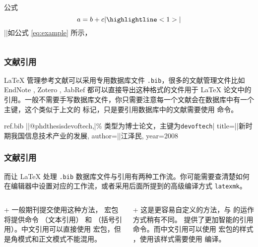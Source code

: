 {\begin{frame}[fragile]
\begin{columns}
\begin{column}{0.5\textwidth}
\begin{codeblock}[]{公式}
\begin{equation}
  a = b + c
|\highlightline<1>|\label{eq:example}
\end{equation}
||如公式 \eqref{eq:example} 所示，
\end{codeblock}
    \end{column}
  \end{columns}
\end{frame}

\begin{frame}[fragile]
  \frametitle{文献引用}
  \LaTeX{} 管理参考文献可以采用专用数据库文件 \texttt{.bib}，很多的文献管理文件比如 EndNote , Zotero , JabRef  都可以直接导出这种格式的文件用于 \LaTeX{} 论文中的引用。一般不需要手写数据库文件，你只需要注意每一个文献会在数据库中有一个主键，这个类似于上文的  标记，只是要引用数据库中的文献需要使用  命令。
  
  \begin{codeblock}[]{ref.bib}
|\highlightline|@phdthesis{devoftech,|\hfill\alert{\% 类型为博士论文，主键为\texttt{devoftech}}|
  title={||新时期我国信息技术产业的发展},
  author={||江泽民},
  year={2008}
}
  \end{codeblock}
\end{frame}

\begin{frame}
  \frametitle{文献引用}
  而让 \LaTeX{} 处理 \texttt{.bib} 数据库文件与引用有两种工作流。你可能需要查清楚如何在编辑器中设置对应的工作流，或者采用后面所提到的高级编译方式 \texttt{latexmk}。
  \begin{columns}
    \begin{column}{0.5\textwidth}
      \begin{block}{ + }
        一般期刊提交使用这种方法， 宏包将提供命令 （文本引用） 和 （括号引用）。中文引用可以直接使用  宏包，但是角模式和正文模式不能混用。
      \end{block}
    \end{column}
    \begin{column}{0.5\textwidth}
      \begin{block}{ + }
        这是更容易自定义的方法，与  的运作方式稍有不同。 提供了更加智能的引用命令。而中文引用可以使用  宏包的样式 ，使用该样式需要使用  编译。
      \end{block}
    \end{column}
  \end{columns}
\end{frame}

}
